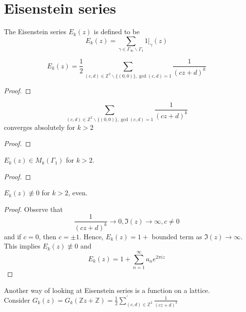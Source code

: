 \documentclass[oneside, 12pt, ]{scrbook}
\newcommand{\ZZ}{\mathbb Z}
\theoremstyle{theorem}
\begin{document}
\section{Eisenstein series}

\begin{definition}
The Eisenstein series $E_{k}(z)$ is defined to be $$E_{k}(z) = \sum_{\gamma \in \Gamma_{\infty} \backslash \Gamma_{1}} 1|_{\gamma}(z)$$
\end{definition}

\begin{proposition}
$$E_{k}(z) = \frac{1}{2} \sum_{(c,d) \in \ZZ^{2} \backslash \{(0,0)\}, \gcd(c,d)=1} \frac{1}{(cz+d)^k}$$
\end{proposition}

\begin{proof}

\end{proof}

\begin{proposition}
$$\sum_{(c,d) \in \ZZ^{2} \backslash \{(0,0)\}, \gcd(c,d)=1} \frac{1}{(cz+d)^k}$$ converges absolutely for $k>2$
\end{proposition}

\begin{proof}

\end{proof}

\begin{theorem}
$E_{k}(z) \in M_{k}(\Gamma_{1})$ for $k >2$.
\end{theorem}

\begin{proof}

\end{proof}

\begin{proposition}
$E_{k}(z) \not \equiv 0$ for $k>2$, even.
\end{proposition}

\begin{proof}
Observe that $$\frac{1}{(cz+d)^k} \rightarrow 0 , \mathfrak{I}(z) \rightarrow \infty , c\neq 0$$ and if $c = 0$, then $c=\pm 1$. Hence, $E_{k}(z) = 1 +$ bounded term as $\mathfrak{I}(z) \rightarrow \infty$. This implies $E_{k}(z) \not \equiv 0$ and $$E_{k}(z) = 1 + \sum_{n=1}^{\infty} a_{n}e^{2 \pi i z}$$
\end{proof}

Another way of looking at Eisenstein series is a function on a lattice. \\
Consider $G_{k}(z) = G_{k}(\ZZ z + \ZZ) = \frac{1}{2} \sum_{(c,d) \in \ZZ^2}^{'} \frac{1}{(cz+d)^k}$
\end{document}
